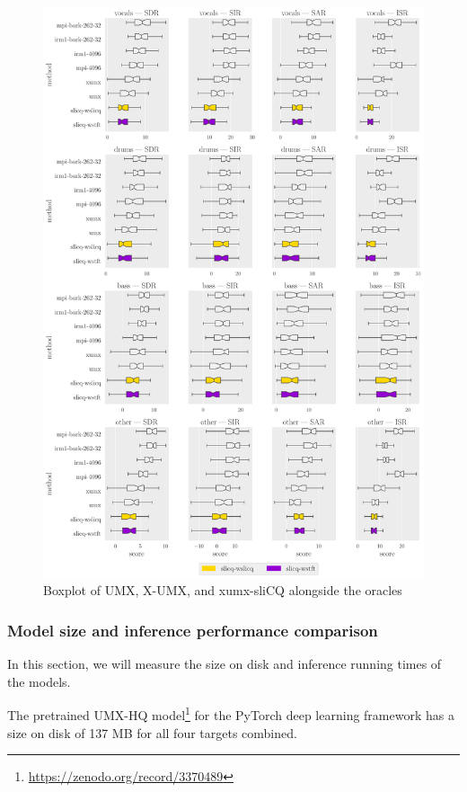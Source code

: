 \documentclass[report.tex]{subfiles}
\begin{document}
\begin{figure}[ht]
	\centering
	\includegraphics[width=\textwidth]{./images-bss/boxplot_full.pdf}
	\caption{Boxplot of UMX, X-UMX, and xumx-sliCQ alongside the oracles}
	\label{fig:bssboxplot}
\end{figure}

\newpagefill

\subsubsection{Model size and inference performance comparison}
\label{sec:inferenceperf}

In this section, we will measure the size on disk and inference running times of the models.

The pretrained UMX-HQ model\footnote{\url{https://zenodo.org/record/3370489}} for the PyTorch deep learning framework has a size on disk of 137 MB for all four targets combined.
\end{document}
